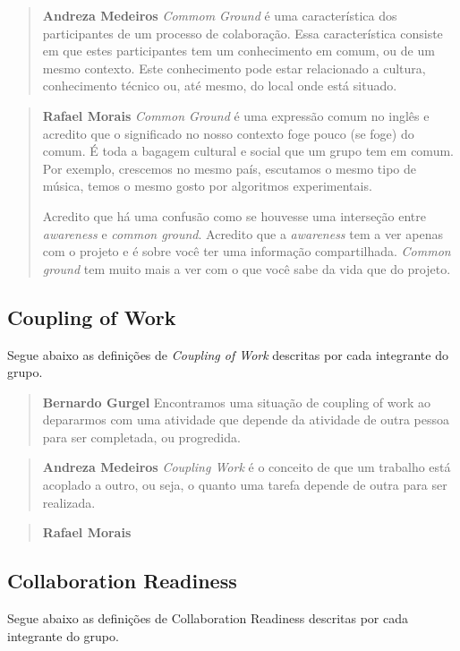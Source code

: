 \documentclass{acm_proc_article-sp}
\begin{document}
\begin{quote}\textbf{Andreza Medeiros}
\textsl{Commom Ground} é uma característica dos participantes de um processo de colaboração\cite{Olson:DM}. Essa característica consiste em que estes participantes tem um conhecimento em comum, ou de um mesmo contexto. Este conhecimento pode estar relacionado a cultura, conhecimento técnico ou, até mesmo, do local onde está situado. 
\end{quote}

\begin{quote}\textbf{Rafael Morais}
  \textsl{Common Ground} é uma expressão comum no inglês e acredito que o significado no nosso contexto foge pouco (se foge) do comum.
  É toda a bagagem cultural e social que um grupo tem em comum.
  Por exemplo, crescemos no mesmo país, escutamos o mesmo tipo de música, temos o mesmo gosto por algoritmos experimentais.

  Acredito que há uma confusão como se houvesse uma interseção entre \textsl{awareness} e \textsl{common ground}. Acredito que a
  \textsl{awareness} tem a ver apenas com o projeto e é sobre você ter uma informação compartilhada. \textsl{Common ground} tem muito
  mais a ver com o que você sabe da vida que do projeto.
\end{quote}

\subsection{Coupling of Work}
Segue abaixo as definições de \textsl{Coupling of Work} descritas por cada integrante do grupo.

\begin{quote}\textbf{Bernardo Gurgel}
Encontramos uma situação de coupling of work ao depararmos com uma atividade que depende da atividade de outra pessoa para ser completada, ou progredida.
\end{quote}

\begin{quote}\textbf{Andreza Medeiros}
\textsl{Coupling Work} é o conceito de que um trabalho está acoplado a outro, ou seja, o quanto uma tarefa depende de outra para ser realizada. 
\end{quote}

\begin{quote}\textbf{Rafael Morais}
\end{quote}

\subsection{Collaboration Readiness}
Segue abaixo as definições de Collaboration Readiness descritas por cada integrante do grupo.
\end{document}
